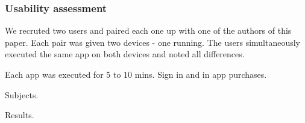 \subsubsection{Usability assessment}

We recruted two users and paired each one up with one of the authors of this paper.  Each pair was given two devices - one running. 
The users simultaneously executed the same app on both devices and noted all differences.

Each app was executed for 5 to 10 mins. Sign in and in app purchases.

Subjects.

Results.




